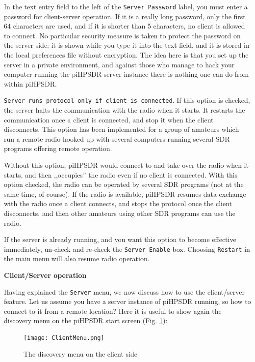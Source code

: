 \documentclass[12pt]{book}
\def\rett#1{\texttt{\color{red}#1}}
\def\bltt#1{\texttt{\color{blue}#1}}
\def\pH{pi\-HPSDR\xspace}
\begin{document}
In the text entry field to the left of   the \rett{Server Password} label, you must enter a password for
client-server operation. If it is a really long password, only the first 64 characters are used, and if it
is shorter than 5 characters, no client is allowed to connect. No particular security measure is taken
to protect the password on the server side: it is  shown while you type it into the  text field, and it is
stored in the local preferences file without encryption. The idea here is that you set up the server
in a private environment, and against those who manage to hack your computer running the \pH server instance
there is nothing one can do from within \pH.

\rett{Server runs protocol only if client is connected}.
 If this option is checked, the server halts
the communication with the radio when it starts. It restarts the communication once a client is connected,
and stop it when the client disconnects. This option has been implemented for a group of amateurs which
run a remote radio hooked up with several computers running several SDR programs offering remote operation.

Without this option, \pH would connect to and take over the radio when it starts, and then ,,occupies''
the radio even if no client is connected. With this option checked, the radio can be operated by
several SDR programs (not at the same time, of course). If the radio is available, \pH resumes
data exchange with the radio once a client connects, and stops the protocol once the client disconnects,
and then other amateurs using other SDR programs can use the radio.

If the server is already running, and you want this option to become effective immediately,
un-check and re-check the \rett{Server Enable} box. Choosing \rett{Restart} in the main menu
will also resume radio operation.

\textbf{Client/Server operation}

Having explained the \bltt{Server} menu, we now discuss how to use the client/server feature.
Let us assume you have a server instance of \pH running, so how to connect  to it from a  remote location?
Here it is useful to show again the discovery menu on the \pH start screen (Fig. \ref{fig:clientmenu}):

\begin{figure}[ht]
\center
\texttt{[image: ClientMenu.png]}
\caption{The discovery menu on the client side}
\label{fig:clientmenu}
\end{figure}
\end{document}
